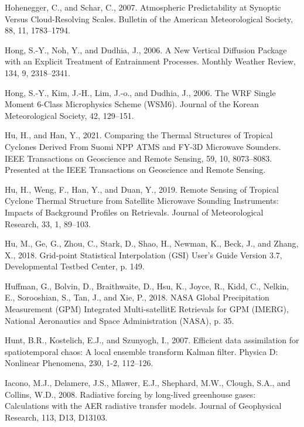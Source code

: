 \documentclass[12pt,oneside]{reedthesis}
\begin{document}
\leavevmode\hypertarget{ref-hohenegger2007}{}%
Hohenegger, C., and Schar, C., 2007. Atmospheric Predictability at Synoptic Versus Cloud-Resolving Scales. Bulletin of the American Meteorological Society, 88, 11, 1783--1794.

\leavevmode\hypertarget{ref-hong2006a}{}%
Hong, S.-Y., Noh, Y., and Dudhia, J., 2006. A New Vertical Diffusion Package with an Explicit Treatment of Entrainment Processes. Monthly Weather Review, 134, 9, 2318--2341.

\leavevmode\hypertarget{ref-hong2006}{}%
Hong, S.-Y., Kim, J.-H., Lim, J.-o., and Dudhia, J., 2006. The WRF Single Moment 6-Class Microphysics Scheme (WSM6). Journal of the Korean Meteorological Society, 42, 129--151.

\leavevmode\hypertarget{ref-hu2021}{}%
Hu, H., and Han, Y., 2021. Comparing the Thermal Structures of Tropical Cyclones Derived From Suomi NPP ATMS and FY-3D Microwave Sounders. IEEE Transactions on Geoscience and Remote Sensing, 59, 10, 8073--8083. Presented at the IEEE Transactions on Geoscience and Remote Sensing.

\leavevmode\hypertarget{ref-hu2019}{}%
Hu, H., Weng, F., Han, Y., and Duan, Y., 2019. Remote Sensing of Tropical Cyclone Thermal Structure from Satellite Microwave Sounding Instruments: Impacts of Background Profiles on Retrievals. Journal of Meteorological Research, 33, 1, 89--103.

\leavevmode\hypertarget{ref-hu2018}{}%
Hu, M., Ge, G., Zhou, C., Stark, D., Shao, H., Newman, K., Beck, J., and Zhang, X., 2018. Grid-point Statistical Interpolation (GSI) User's Guide Version 3.7, Developmental Testbed Center, p. 149.

\leavevmode\hypertarget{ref-huffman2018}{}%
Huffman, G., Bolvin, D., Braithwaite, D., Hsu, K., Joyce, R., Kidd, C., Nelkin, E., Sorooshian, S., Tan, J., and Xie, P., 2018. NASA Global Precipitation Measurement (GPM) Integrated Multi-satellitE Retrievals for GPM (IMERG), National Aeronautics and Space Administration (NASA), p. 35.

\leavevmode\hypertarget{ref-hunt2007}{}%
Hunt, B.R., Kostelich, E.J., and Szunyogh, I., 2007. Efficient data assimilation for spatiotemporal chaos: A local ensemble transform Kalman filter. Physica D: Nonlinear Phenomena, 230, 1-2, 112--126.

\leavevmode\hypertarget{ref-iacono2008}{}%
Iacono, M.J., Delamere, J.S., Mlawer, E.J., Shephard, M.W., Clough, S.A., and Collins, W.D., 2008. Radiative forcing by long-lived greenhouse gases: Calculations with the AER radiative transfer models. Journal of Geophysical Research, 113, D13, D13103.
\end{document}
